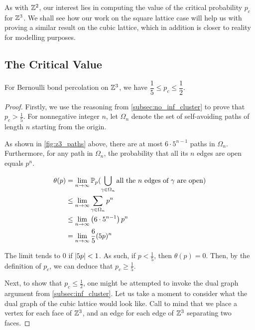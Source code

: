 \documentclass[a4paper, 12pt]{article}
\begin{document}
As with $\Z^2$, our interest lies in computing the value of the critical probability $p_c$ for $\Z^3$. We shall see how our work on the square lattice case will help us with proving a similar result on the cubic lattice, which in addition is closer to reality for modelling purposes.

\subsection{The Critical Value}
\begin{thm}\label{thm:pc_on_Z3}
For Bernoulli bond percolation on $\Z^3$, we have $\dfrac{1}{5} \leq p_c \leq \dfrac{1}{2}$.
\end{thm}
\begin{proof}
Firstly, we use the reasoning from \cref{subsec:no_inf_cluster} to prove that $p_c > \frac{1}{5}$. For nonnegative integer $n$, let $\Omega_n$ denote the set of self-avoiding paths of length $n$ starting from the origin.



As shown in \cref{fig:z3_paths} above, there are at most $6 \cdot 5^{n - 1}$ paths in $\Omega_n$. Furthermore, for any path in $\Omega_n$, the probability that all its $n$ edges are open equals $p^n$.

\begin{align*}
    \theta(p) 
    &= \lim_{n \to \infty} \P(\bigcup_{\gamma \in \Omega_n} \text{all the } n \text{ edges of } \gamma \text{ are open})\\
    &\leq \lim_{n \to \infty} \sum_{\gamma \in \Omega_n} p^n\\
    &\leq \lim_{n \to \infty} \left(6 \cdot 5^{n - 1}\right) p^n\\
    &= \lim_{n \to \infty} \frac{6}{5} (5 p)^{n}
\end{align*}

The limit tends to 0 if $\abs{5p} < 1$. As such, if $p < \frac{1}{5}$, then $\theta(p) = 0$. Then, by the definition of $p_c$, we can deduce that $p_c \geq \frac{1}{5}$.

Next, to show that $p_c \leq \frac{1}{2}$, one might be attempted to invoke the dual graph argument from \cref{subsec:inf_cluster}. Let us take a moment to consider what the dual graph of the cubic lattice would look like. Call to mind that we place a vertex for each face of $\Z^3$, and an edge for each edge of $\Z^3$ separating two faces.




\end{proof}
\end{document}
